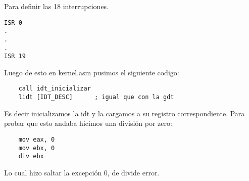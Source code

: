 \noindent Para definir las 18 interrupciones.

\begin{codesnippet}
\begin{verbatim}
ISR 0
.
.
.
ISR 19
\end{verbatim}
\end{codesnippet}


\noindent Luego de esto en kernel.asm pusimos el siguiente codigo:

\begin{codesnippet}
\begin{verbatim}
    call idt_inicializar
    lidt [IDT_DESC]      ; igual que con la gdt
\end{verbatim}
\end{codesnippet}

\noindent Es decir inicializamos la idt y la cargamos a su registro correspondiente. Para probar que esto andaba hicimos una división por zero:

\begin{codesnippet}
\begin{verbatim}
    mov eax, 0
    mov ebx, 0
    div ebx
\end{verbatim}
\end{codesnippet}

\noindent Lo cual hizo saltar la excepción 0, de divide error.
